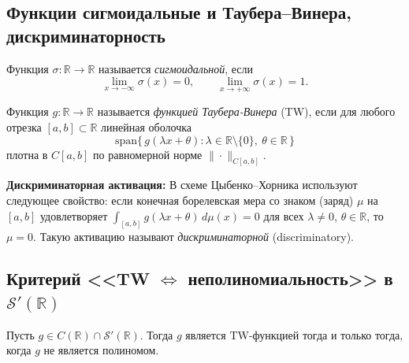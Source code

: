 \documentclass[../NDCNNAI_main.tex]{subfiles}
\begin{document}
\subsection*{Функции сигмоидальные и Таубера--Винера, дискриминаторность}

\begin{definition}\label{def:sigmoid}
Функция \(\sigma\colon\mathbb{R}\to\mathbb{R}\) называется \emph{сигмоидальной}, если
\[
\lim_{x\to-\infty}\sigma(x)=0,\qquad \lim_{x\to+\infty}\sigma(x)=1.
\]
\end{definition}

\begin{definition}\label{def:TW}
Функция \(g\colon\mathbb{R}\to\mathbb{R}\) называется \emph{функцией Таубера-Винера} (TW),
если для любого отрезка \([a,b]\subset\mathbb{R}\) линейная оболочка
\[
\mathrm{span}\{\, g(\lambda x+\theta)\colon \lambda\in\mathbb{R}\setminus\{0\},\ \theta\in\mathbb{R}\,\}
\]
плотна в \(C[a,b]\) по равномерной норме \(\|\cdot\|_{C[a,b]}\).
\end{definition}

\textbf{Дискриминаторная активация:}
В схеме Цыбенко--Хорника используют следующее свойство:
если конечная борелевская мера со знаком (заряд) \(\mu\) на \([a,b]\) удовлетворяет
\(\int_{[a,b]} g(\lambda x+\theta)\,d\mu(x)=0\) для всех \(\lambda\ne 0\), \(\theta\in\mathbb R\),
то \(\mu=0\).
Такую активацию называют \emph{дискриминаторной} (discriminatory).

\subsection{Критерий <<TW \(\Leftrightarrow\) неполиномиальность>> в \(\mathcal{S}'(\mathbb{R})\)}

\begin{theorem}\label{thm:TW_nonpoly}
Пусть \(g\in C(\mathbb{R})\cap \mathcal{S}'(\mathbb{R})\).
Тогда \(g\) является TW-функцией тогда и только тогда, когда \(g\) не является полиномом.
\end{theorem}
\end{document}
